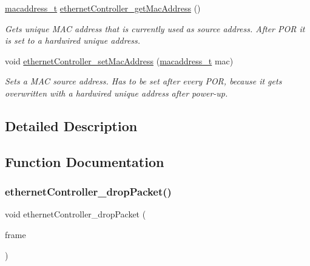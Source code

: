 \begin{DoxyCompactItemize}
\mbox{\hyperlink{group__ethernet_gacb865bcbf50a6c8cef05581bfabff373}{macaddress\+\_\+t}} \mbox{\hyperlink{group__data__reception_gae3335ee23b52ab5086b95f83127b755c}{ethernet\+Controller\+\_\+get\+Mac\+Address}} ()
\begin{DoxyCompactList}\small\item\em Gets unique M\+AC address that is currently used as source address. After P\+OR it is set to a hardwired unique address. \end{DoxyCompactList}\item 
void \mbox{\hyperlink{group__data__reception_ga4856965b47df99d3532a7d1cbb494e02}{ethernet\+Controller\+\_\+set\+Mac\+Address}} (\mbox{\hyperlink{group__ethernet_gacb865bcbf50a6c8cef05581bfabff373}{macaddress\+\_\+t}} mac)
\begin{DoxyCompactList}\small\item\em Sets a M\+AC source address. Has to be set after every P\+OR, because it gets overwritten with a hardwired unique address after power-\/up. \end{DoxyCompactList}\end{DoxyCompactItemize}


\subsection{Detailed Description}


\subsection{Function Documentation}
\mbox{\label{group__data__reception_gada8fcdc667d1800b5f963bfc8cea56c2}} 
\subsubsection{\texorpdfstring{ethernetController\_dropPacket()}{ethernetController\_dropPacket()}}
{\footnotesize\ttfamily void ethernet\+Controller\+\_\+drop\+Packet (\begin{DoxyParamCaption}\item[{\mbox{\hyperlink{group__ethernet_ga7519a7ae14b490659069435698d28a25}{ethernet\+Frame\+\_\+t}} $\ast$}]{frame }\end{DoxyParamCaption})}



